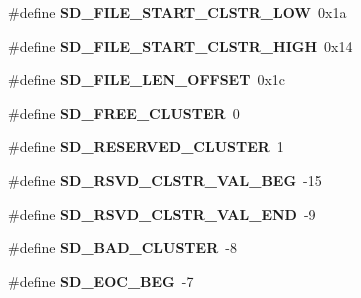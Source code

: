 \begin{DoxyCompactItemize}
\item 
\hypertarget{group__sd__private_ga09fdb11a44ceb392e1ba33655cb801b4}{\#define {\bfseries \-S\-D\-\_\-\-F\-I\-L\-E\-\_\-\-S\-T\-A\-R\-T\-\_\-\-C\-L\-S\-T\-R\-\_\-\-L\-O\-W}~0x1a}\label{group__sd__private_ga09fdb11a44ceb392e1ba33655cb801b4}

\item 
\hypertarget{group__sd__private_ga7f7f97fa49a5af7e4efc920143b8fb81}{\#define {\bfseries \-S\-D\-\_\-\-F\-I\-L\-E\-\_\-\-S\-T\-A\-R\-T\-\_\-\-C\-L\-S\-T\-R\-\_\-\-H\-I\-G\-H}~0x14}\label{group__sd__private_ga7f7f97fa49a5af7e4efc920143b8fb81}

\item 
\hypertarget{group__sd__private_ga40e0a7a4a9d43d3dd4616b24f01fc589}{\#define {\bfseries \-S\-D\-\_\-\-F\-I\-L\-E\-\_\-\-L\-E\-N\-\_\-\-O\-F\-F\-S\-E\-T}~0x1c}\label{group__sd__private_ga40e0a7a4a9d43d3dd4616b24f01fc589}

\item 
\hypertarget{group__sd__private_ga81fb1a9cc778809509b1184ab1cd0908}{\#define {\bfseries \-S\-D\-\_\-\-F\-R\-E\-E\-\_\-\-C\-L\-U\-S\-T\-E\-R}~0}\label{group__sd__private_ga81fb1a9cc778809509b1184ab1cd0908}

\item 
\hypertarget{group__sd__private_ga1c3c4d7ed9069123ac22268fafdfed19}{\#define {\bfseries \-S\-D\-\_\-\-R\-E\-S\-E\-R\-V\-E\-D\-\_\-\-C\-L\-U\-S\-T\-E\-R}~1}\label{group__sd__private_ga1c3c4d7ed9069123ac22268fafdfed19}

\item 
\hypertarget{group__sd__private_ga7d5efcd9405979bb84f21a7459d52b21}{\#define {\bfseries \-S\-D\-\_\-\-R\-S\-V\-D\-\_\-\-C\-L\-S\-T\-R\-\_\-\-V\-A\-L\-\_\-\-B\-E\-G}~-\/15}\label{group__sd__private_ga7d5efcd9405979bb84f21a7459d52b21}

\item 
\hypertarget{group__sd__private_gab54884fb7e83807f0fc6f307d3756cab}{\#define {\bfseries \-S\-D\-\_\-\-R\-S\-V\-D\-\_\-\-C\-L\-S\-T\-R\-\_\-\-V\-A\-L\-\_\-\-E\-N\-D}~-\/9}\label{group__sd__private_gab54884fb7e83807f0fc6f307d3756cab}

\item 
\hypertarget{group__sd__private_ga59d00d84efb347d1f75cb449d5de1258}{\#define {\bfseries \-S\-D\-\_\-\-B\-A\-D\-\_\-\-C\-L\-U\-S\-T\-E\-R}~-\/8}\label{group__sd__private_ga59d00d84efb347d1f75cb449d5de1258}

\item 
\hypertarget{group__sd__private_ga2e17258ea7a28bc708a9e453abad394f}{\#define {\bfseries \-S\-D\-\_\-\-E\-O\-C\-\_\-\-B\-E\-G}~-\/7}\label{group__sd__private_ga2e17258ea7a28bc708a9e453abad394f}


\end{DoxyCompactItemize}
